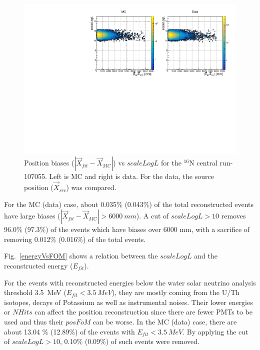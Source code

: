 \begin{figure}
	\centering
		\includegraphics[width=13cm]{N16_107055_scaleLogLvsPosBias.pdf}
	\caption{Position biases ($|\vec{X}_{fit}-\vec{X}_{MC}|$) vs $scaleLogL$ for the $^{16}$N central run-107055. Left is MC and right is data. For the data, the source position ($\vec{X}_{src}$) was compared.}
	\label{posBiasVsFOM}
\end{figure}

For the MC (data) case, about 0.035\% (0.043\%) of the total reconstructed events have large biases ($|\vec{X}_{fit}-\vec{X}_{MC}|>6000~mm$). A cut of $scaleLogL>10$ removes 96.0\% (97.3\%) of the events which have biases over 6000 mm, with a sacrifice of removing 0.012\% (0.016\%) of the total events.

Fig.~\ref{energyVsFOM} shows a relation between the $scaleLogL$ and the reconstructed energy ($E_{fit}$). 

For the events with reconstructed energies below the water solar neutrino analysis threshold 3.5~MeV ($E_{fit}<3.5~MeV$), they are mostly coming from the U/Th isotopes, decays of Potassium as well as instrumental noises\cite{waterunidoc}. Their lower energies or $NHits$ can affect the position reconstruction since there are fewer PMTs to be used and thus their $posFoM$ can be worse.
In the MC (data) case, there are about 13.04 \% (12.89\%) of the events with $E_{fit}<3.5~MeV$. By applying the cut of $scaleLogL>10$, 0.10\% (0.09\%) of such events were removed.


